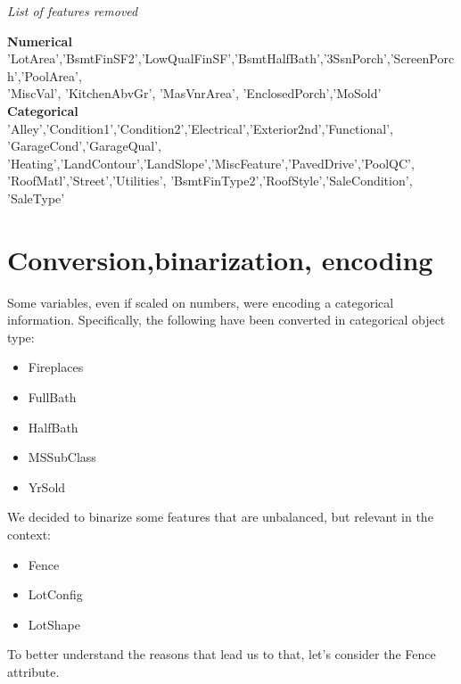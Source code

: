 \emph{List of features removed}

\textbf{Numerical}
'LotArea','BsmtFinSF2','LowQualFinSF','BsmtHalfBath','3SsnPorch','ScreenPorch','PoolArea',\\ 'MiscVal', 'KitchenAbvGr', 'MasVnrArea', 'EnclosedPorch','MoSold'\\ 
\textbf{Categorical}
'Alley','Condition1','Condition2','Electrical','Exterior2nd','Functional',\\'GarageCond','GarageQual', 'Heating','LandContour','LandSlope','MiscFeature','PavedDrive','PoolQC',\\'RoofMatl','Street','Utilities', 'BsmtFinType2','RoofStyle','SaleCondition', 'SaleType'



\section{Conversion,binarization, encoding}
Some variables, even if scaled on numbers, were encoding a categorical information. Specifically, the following have been converted in categorical object type: 
\begin{itemize}
    \item Fireplaces
    \item FullBath
    \item HalfBath
    \item MSSubClass
    \item YrSold
\end{itemize}

We decided to binarize some features that are unbalanced, but relevant in the context:
\begin{itemize}
    \item Fence
    \item LotConfig
    \item LotShape
\end{itemize}

To better understand the reasons that lead us to that, let's consider the Fence attribute.


